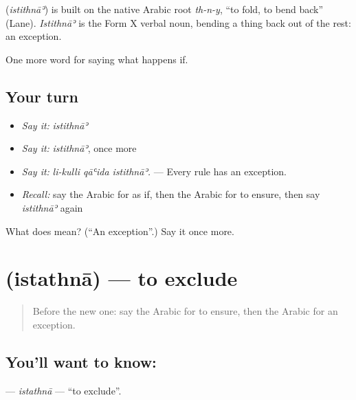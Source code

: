 \begin{cousinweb}
\textbf{} (\emph{istithnāʾ}) is built on the native Arabic root \emph{th-n-y}, \textquotedblleft{}to fold, to bend back\textquotedblright{} (Lane). \emph{Istithnāʾ} is the Form X verbal noun, bending a thing back out of the rest: an exception.
\end{cousinweb}

\begin{grammarlens}[title={What you've built}]
One more word for saying what happens if.
\end{grammarlens}

\subsection*{Your turn}
\begin{itemize}
\raggedright
  \item \emph{Say it:} \emph{istithnāʾ}
  \item \emph{Say it:} \emph{istithnāʾ}, once more
  \item \emph{Say it:} \emph{li-kulli qāʿida istithnāʾ.} — Every rule has an exception.
  \item \emph{Recall:} say the Arabic for as if, then the Arabic for to ensure, then say \emph{istithnāʾ} again
\end{itemize}

\begin{tcolorbox}[breakable,colback=teal!4,colframe=teal!35!black,title={Before you move on}]
What does  mean? (\textquotedblleft{}An exception\textquotedblright{}.) Say it once more.
\end{tcolorbox}
\section[\texorpdfstring{\ar{استثنى} (istathnā)}{استثنى (istathnā)}]{ (istathnā) — to exclude}

\label{lesson:AR-C405-istathna}



\begin{quote}
Before the new one: say the Arabic for to ensure, then the Arabic for an exception.
\end{quote}

\subsection*{You'll want to know: }
\textbf{} — \emph{istathnā} — \textquotedblleft{}to exclude\textquotedblright{}.

